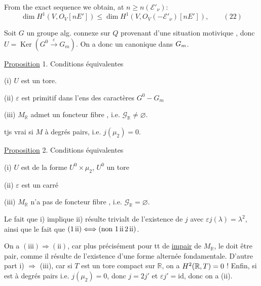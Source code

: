 From the exact sequence
we obtain, at $n\ge n(\mathcal E'_\nu)$:
\[
\dim H^1(V,O_V[nE'])\le\dim H^1(V,O_V(-\mathcal E'_\nu)[nE']),\qquad (22)
\]

Soit $G$ un groupe  alg. connexe sur $Q$ provenant d'une situation motivique , donc $U=\operatorname{Ker}(G^0\xrightarrow{\varepsilon}G_m)$. On a donc un  canonique dans ${G_m}$.


\uline{Proposition} 1. Conditions équivalentes

(i) $U$ est un tore.

(ii) $\varepsilon$ est primitif dans l'ens des caractères $G^0\mathbin{-}G_m$

(iii) $M_{\mathbb R}$ admet un foncteur fibre , i.e. $\mathscr G_{\mathbb R}\ne\varnothing$.

 tjs vrai si $M$ à degrés pairs, i.e. $j(\mu_2)=0$.

\uline{Proposition} 2. Conditions équivalentes

(i) $U$ est de la forme $U^0\times\mu_2$, $U^0$ un tore

(ii) $\varepsilon$ est  un carré 

(iii) $M_{\mathbb R}$ n'a pas de foncteur fibre , i.e. $\mathscr G_{\mathbb R}=\varnothing$.

Le fait que i) implique ii)  résulte trivialt de  l'existence de $j$ avec $\varepsilon j(\lambda)=\lambda^2$, ainsi que le fait que $(1\,\mathrm{ii})\Longleftrightarrow(\text{non }{{1\,\mathrm{ii}}}\,2\,\mathrm{ii})$.

On a $(\mathrm{iii})\Rightarrow(\mathrm{ii})$, car plus précisément pour tt   de    \uline{impair} de $M_{\mathbb R}$, le   doit être pair, comme il résulte de l'existence d'une forme alternée fondamentale. D'autre part i) $\Rightarrow$ (iii), car si $T$ est un tore compact sur $\mathbb R$, on a $H^{{2}}(\mathbb R,T)=0$ ! Enfin, si   est à degrés pairs i.e. $j(\mu_2)=0$, donc $j=2j'$ et $\varepsilon j'=\mathrm{id}$, donc on a (ii).

